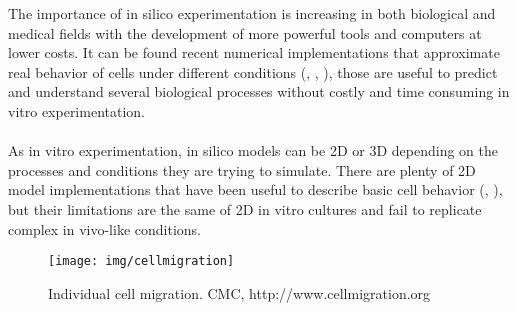 The importance of in silico experimentation is increasing in both biological and medical fields with the development of more powerful tools and computers at lower costs. It can be found recent numerical implementations that approximate real behavior of cells under different conditions (\cite{Vermolen2013b}, \cite{Milde2014}, \cite{Geris2010}), those are useful to predict and understand several biological processes without costly and time consuming in vitro experimentation.\\
\\
As in vitro experimentation, in silico models can be 2D or 3D depending on the processes and conditions they are trying to simulate. There are plenty of 2D model implementations that have been useful to describe basic cell behavior (\cite{Rey2013}, \cite{Vermolen2012}), but their limitations are the same of 2D in vitro cultures and fail to replicate complex in vivo-like conditions.\\

\begin{figure}[h]
\centering
\setlength\fboxsep{0pt}
\setlength\fboxrule{0.5pt}
\texttt{[image: img/cellmigration]}
\caption{Individual cell migration. CMC, http://www.cellmigration.org}
\label{fig:cellmigration}
\end{figure}

